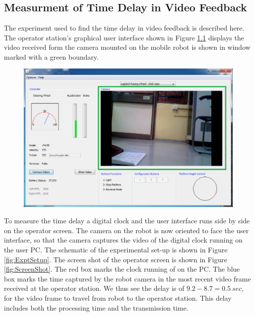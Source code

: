 \chapter{ }
\section{Measurment of Time Delay in Video Feedback}
\label{app:DH}
The experiment used to find the time delay in video feedback is described here. The operator station's graphical user interface shown in Figure \ref{fig:Gui2} displays the video received form the camera mounted on the mobile robot is shown in window marked with a green boundary.   
\begin{figure}
	\includegraphics[width=\linewidth,keepaspectratio]{Chapter5/fig/gui1}
	\label{fig:Gui2} 
\end{figure}

To measure the time delay a digital clock and the user interface runs side by side on the operator screen. The camera on the robot is now oriented to face the user interface, so that the camera captures the video of the digital clock running on the user PC. The schematic of the experimental set-up is shown in Figure \ref{fig:ExptSetup}. The screen shot of the operator screen is shown in Figure \ref{fig:ScreenShot}. The red box marks the clock running of on the PC. The blue box marks the time captured by the robot camera in the most recent video frame received at the operator station. We thus see the delay is of $9.2-8.7=0.5~sec$, for the video frame to travel from robot to the operator station. This delay includes both the processing time and the transmission time.

